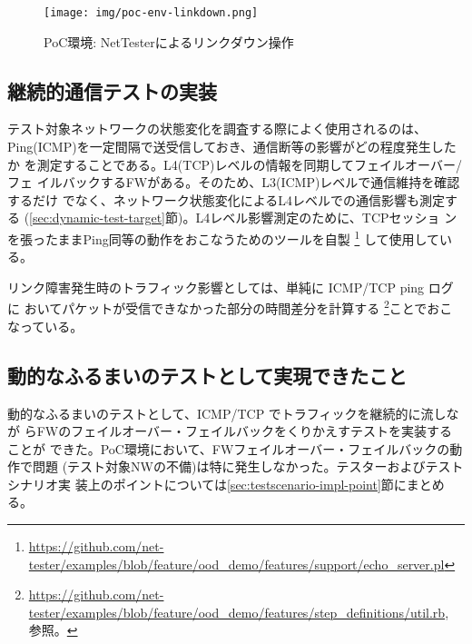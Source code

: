 \begin{figure}[h]
 \centering
 \texttt{[image: img/poc-env-linkdown.png]}
 \caption{PoC環境: NetTesterによるリンクダウン操作}
 \label{fig:poc-env-linkdown}
\end{figure}

  \subsection{継続的通信テストの実装}

テスト対象ネットワークの状態変化を調査する際によく使用されるのは、
Ping(ICMP)を一定間隔で送受信しておき、通信断等の影響がどの程度発生したか
を測定することである。L4(TCP)レベルの情報を同期してフェイルオーバー/フェ
イルバックするFWがある。そのため、L3(ICMP)レベルで通信維持を確認するだけ
でなく、ネットワーク状態変化によるL4レベルでの通信影響も測定する
(\ref{sec:dynamic-test-target}節)。L4レベル影響測定のために、TCPセッショ
ンを張ったままPing同等の動作をおこなうためのツールを自製
\footnote{\url{https://github.com/net-tester/examples/blob/feature/ood_demo/features/support/echo_server.pl}}
して使用している。

リンク障害発生時のトラフィック影響としては、単純に ICMP/TCP ping ログに
おいてパケットが受信できなかった部分の時間差分を計算する
\footnote{\url{https://github.com/net-tester/examples/blob/feature/ood_demo/features/step_definitions/util.rb},
参照。}ことでおこなっている。

  \subsection{動的なふるまいのテストとして実現できたこと}
  \label{sec:dynamic-test-result}

動的なふるまいのテストとして、ICMP/TCP でトラフィックを継続的に流しなが
らFWのフェイルオーバー・フェイルバックをくりかえすテストを実装することが
できた。PoC環境において、FWフェイルオーバー・フェイルバックの動作で問題
(テスト対象NWの不備)は特に発生しなかった。テスターおよびテストシナリオ実
装上のポイントについては\ref{sec:testscenario-impl-point}節にまとめる。

